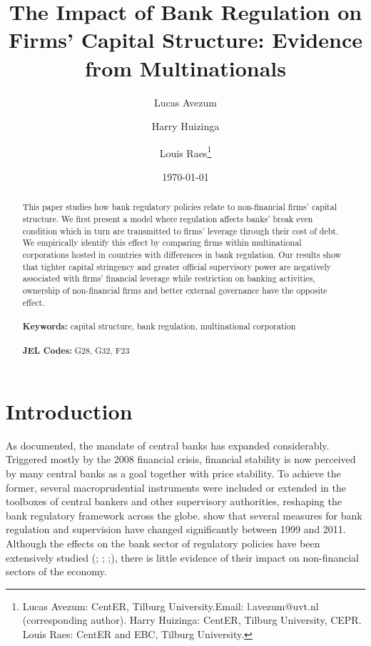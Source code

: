 \documentclass[12pt]{article}
\begin{document}
	
	\begin{titlepage}
		\title{The Impact of Bank Regulation on  Firms' Capital Structure: Evidence from Multinationals}
		
		\author{Lucas Avezum \and Harry Huizinga \and Louis Raes\thanks{Lucas Avezum: CentER, Tilburg University.Email:
				l.avezum@uvt.nl (corresponding author). Harry Huizinga: CentER, Tilburg University, CEPR. Louis Raes: CentER and EBC, Tilburg University.}}
		\date{\today}
		\maketitle
		\begin{abstract}
			\noindent This paper studies how bank regulatory policies relate to non-financial firms' capital structure. We first present a model where regulation affects banks' break even condition which in turn are transmitted to firms' leverage through their cost of debt. We empirically identify this effect by comparing firms within multinational corporations hosted in countries with differences in bank regulation. Our results show that tighter capital stringency and greater official supervisory power are negatively associated with firms' financial leverage while restriction on banking activities, ownership of non-financial firms and better external governance have the opposite effect.  \\
			\vspace{0in}\\
			\noindent\textbf{Keywords:} capital structure, bank regulation, multinational corporation\\
			\vspace{0in}\\
			\noindent\textbf{JEL Codes:} G28, G32, F23 \\
			
			\bigskip
		\end{abstract}
		\setcounter{page}{0}
		\thispagestyle{empty}
	\end{titlepage}
	\pagebreak \newpage
	
	
	\normalem
	
	\doublespacing
	
	
	\section{Introduction} \label{sec:introduction}
	As \cite*{blinder2017necessity} documented, the mandate of central banks has expanded considerably. Triggered mostly by the 2008 financial crisis, financial stability is now perceived by many central banks as a goal together with price stability. To achieve the former, several macroprudential instruments were included or extended in the toolboxes of central bankers and other supervisory authorities, reshaping the bank regulatory framework across the globe. \cite*{barth2013bank} show that several measures for bank regulation and supervision have changed significantly between 1999 and 2011. Although the effects on the bank sector of regulatory policies have been extensively studied (\cite*{barth2013}; \cite*{anginer2014does}; \cite*{caprio2014macro};\cite*{demirguc2013bank}), there is little evidence of their impact on non-financial sectors of the economy. 
	
\end{document}
